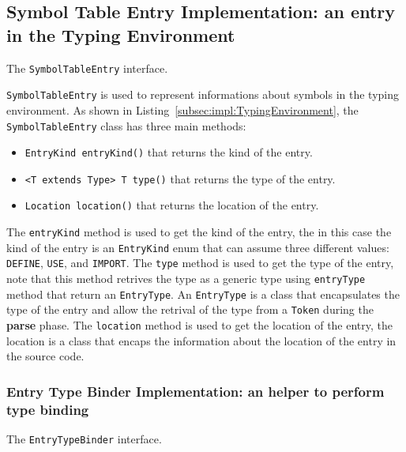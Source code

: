 \subsection{Symbol Table Entry Implementation: an entry in the Typing Environment}\label{subsec:impl:SymbolTableEntry}
\begin{Listing}[tbh]
    \centering
    \caption{The \texttt{SymbolTableEntry} interface.}
    \label{lst:impl:SymbolTableEntry}
\end{Listing}

\texttt{SymbolTableEntry} is used to represent informations about symbols in the typing environment. As shown in Listing~\ref{subsec:impl:TypingEnvironment}, the \texttt{SymbolTableEntry} class has three main methods:

\begin{itemize}
    \item \texttt{EntryKind entryKind()} that returns the kind of the entry.
    \item \texttt{<T extends Type> T type()} that returns the type of the entry.
    \item \texttt{Location location()} that returns the location of the entry.
\end{itemize}

The \texttt{entryKind} method is used to get the kind of the entry, the in this case the kind of the entry is an \texttt{EntryKind} enum that can assume three different values: \texttt{DEFINE}, \texttt{USE}, and \texttt{IMPORT}. The \texttt{type} method is used to get the type of the entry, note that this method retrives the type as a generic type using \texttt{entryType} method that return an \texttt{EntryType}. An \texttt{EntryType} is a class that encapsulates the type of the entry and allow the retrival of the type from a \texttt{Token} during the \textbf{parse} phase.
The \texttt{location} method is used to get the location of the entry, the location is a class that encaps the information about the location of the entry in the source code.


\subsubsection{Entry Type Binder Implementation: an helper to perform type binding}\label{subsec:impl:EntryTypeBinder}

\begin{Listing}[tbh]
    \centering
    \caption{The \texttt{EntryTypeBinder} interface.}
    \label{lst:impl:EntryTypeBinder}
\end{Listing}

